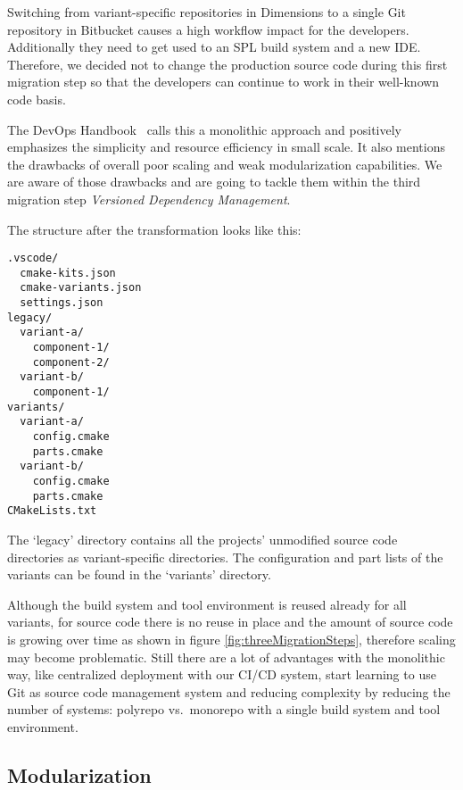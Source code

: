 Switching from variant-specific repositories in Dimensions to a single Git
repository in Bitbucket causes a high workflow impact for the developers.
Additionally they need to get used to an SPL build system and a new IDE.\@
Therefore, we decided not to change the production source code during this first
migration step so that the developers can continue to work in their well-known
code basis.

The DevOps Handbook~\cite{devopshandbook} calls this a monolithic approach and
positively emphasizes the simplicity and resource efficiency in small scale. It
also mentions the drawbacks of overall poor scaling and weak modularization
capabilities. We are aware of those drawbacks and are going to tackle them
within the third migration step \textit{Versioned Dependency Management}.

The structure after the transformation looks like this:
\begin{Verbatim}[frame=single,samepage=true]
.vscode/
  cmake-kits.json
  cmake-variants.json
  settings.json
legacy/
  variant-a/
    component-1/
    component-2/
  variant-b/
    component-1/
variants/
  variant-a/
    config.cmake
    parts.cmake
  variant-b/
    config.cmake
    parts.cmake
CMakeLists.txt
\end{Verbatim}

The `legacy' directory contains all the projects' unmodified source code
directories as variant-specific directories. The configuration and part lists of
the variants can be found in the `variants' directory.

Although the build system and tool environment is reused already for all
variants, for source code there is no reuse in place and the amount of source
code is growing over time as shown in figure \ref{fig:threeMigrationSteps},
therefore scaling may become problematic. Still there are a lot of advantages
with the monolithic way, like centralized deployment with our CI/CD system,
start learning to use Git as source code management system and reducing
complexity by reducing the number of systems: polyrepo vs.\ monorepo with a
single build system and tool environment.

\subsection{Modularization}\label{modularization}

